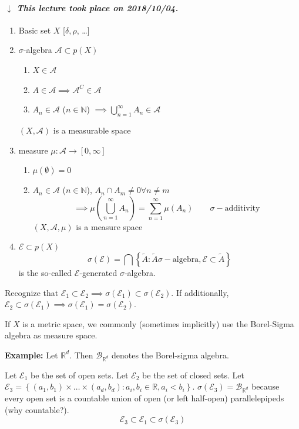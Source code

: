 \documentclass[a4paper]{article}
\numberwithin{lecref}{section}
\theoremstyle{break}
\newcommand{\dateref}[1]{%
  \begin{mdframed}[backgroundcolor=gray!10,innerbottommargin=0pt,innertopmargin=0pt]
    \paragraph{\textit{$\downarrow$ This lecture took place on #1.}}%
  \end{mdframed}%
}
\newcommand{\Set}[1]{\left\{#1\right\}}
\begin{document}
\dateref{2018/10/04}

\begin{enumerate}
  \item Basic set $X$ [$\delta, \rho$, \dots]
  \item $\sigma$-algebra $\mathcal A \subset p(X)$
    \begin{enumerate}
      \item $X \in \mathcal A$
      \item $A \in \mathcal A \implies \mathcal A^C \in \mathcal A$
      \item $A_n \in \mathcal A$ ($n \in \mathbb N$) $\implies \bigcup_{n=1}^\infty A_n \in \mathcal A$
    \end{enumerate}
    $(X, \mathcal A)$ is a measurable space
  \item measure $\mu: \mathcal A \to [0, \infty]$
    \begin{enumerate}
      \item $\mu(\emptyset) = 0$
      \item $A_n \in \mathcal A$ ($n \in \mathbb N$), $A_n \cap A_m \neq 0 \forall n \neq m$
        \[ \implies \mu\left(\bigcup_{n=1}^\infty A_n\right) = \sum_{n=1}^\infty \mu(A_n) \qquad \sigma-\text{additivity} \]
        $(X, \mathcal A, \mu)$ is a measure space
    \end{enumerate}
  \item ${\mathcal E} \subset p(X)$
    \[ \sigma({\mathcal E}) = \bigcap \Set{\tilde A: \tilde A \sigma-\text{algebra}, {\mathcal E} \subset \tilde{A}} \]
    is the so-called ${\mathcal E}$-generated $\sigma$-algebra.
\end{enumerate}
Recognize that ${\mathcal E}_1 \subset {\mathcal E}_2 \implies \sigma({\mathcal E}_1) \subset \sigma({\mathcal E}_2)$.
If additionally, ${\mathcal E}_2 \subset \sigma({\mathcal E}_1) \implies \sigma({\mathcal E}_1) = \sigma({\mathcal E}_2)$.

If $X$ is a metric space, we commonly (sometimes implicitly) use the Borel-Sigma algebra as measure space.

\textbf{Example:}
Let $\mathbb R^d$. Then $\mathcal B_{\mathbb R^d}$ denotes the Borel-sigma algebra.

Let ${\mathcal E}_1$ be the set of open sets. Let ${\mathcal E}_2$ be the set of closed sets.
Let ${\mathcal E}_3 = \Set{(a_1, b_1) \times \dots \times (a_d, b_d): a_i, b_i \in \mathbb R, a_i < b_i}$.
$\sigma(\mathcal E_3) = \mathcal B_{\mathbb R^d}$ because every open set is a countable union of open (or left half-open) parallelepipeds (why countable?).
\[ \mathcal E_3 \subset \mathcal E_1 \subset \sigma(\mathcal E_3) \]
\end{document}
